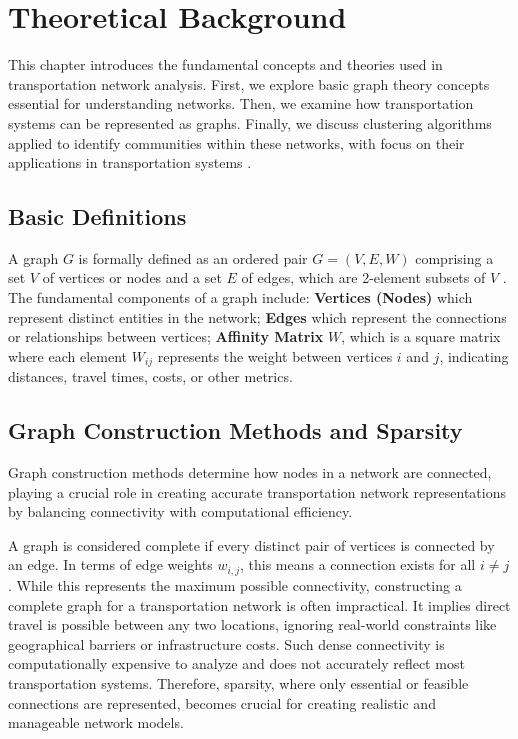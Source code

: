 \chapter{Theoretical Background}
\label{ch:basics}
This chapter introduces the fundamental concepts and theories used in transportation network analysis. First, we explore basic graph theory concepts essential for understanding networks. Then, we examine how transportation systems can be represented as graphs. Finally, we discuss clustering algorithms applied to identify communities within these networks, with focus on their applications in transportation systems .

\section{Basic Definitions}
\label{se:BasicDefinitions}

A graph $G$ is formally defined as an ordered pair $G = (V, E, W)$ comprising a set $V$ of vertices or nodes and a set $E$ of edges, which are 2-element subsets of $V$ . The fundamental components of a graph include: \textbf{Vertices (Nodes)} which represent distinct entities in the network; \textbf{Edges} which represent the connections or relationships between vertices; \textbf{Affinity Matrix} $W$, which is a square matrix where each element $W_{ij}$ represents the weight between vertices $i$ and $j$, indicating distances, travel times, costs, or other metrics.


\section{Graph Construction Methods and Sparsity}
\label{se:GraphConstructionMethodsAndSparsity}

Graph construction methods determine how nodes in a network are connected, playing a crucial role in creating accurate transportation network representations by balancing connectivity with computational efficiency.

A graph is considered complete if every distinct pair of vertices is connected by an edge. In terms of edge weights \(w_{i,j}\), this means a connection exists for all \(i \neq j\). While this represents the maximum possible connectivity, constructing a complete graph for a transportation network is often impractical. It implies direct travel is possible between any two locations, ignoring real-world constraints like geographical barriers or infrastructure costs. Such dense connectivity is computationally expensive to analyze and does not accurately reflect most transportation systems. Therefore, sparsity, where only essential or feasible connections are represented, becomes crucial for creating realistic and manageable network models.

